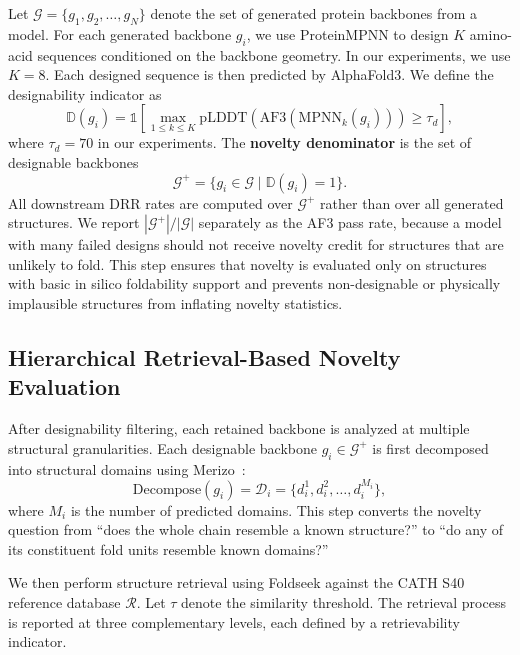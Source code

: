 \documentclass[letterpaper]{article} %
\begin{document}
Let $\mathcal{G} = \{g_1, g_2, \ldots, g_N\}$ denote the set of generated protein backbones from a model. For each generated backbone $g_i$, we use ProteinMPNN to design $K$ amino-acid sequences conditioned on the backbone geometry. In our experiments, we use $K=8$. Each designed sequence is then predicted by AlphaFold3. We define the designability indicator as
\begin{equation}
\mathbb{D}(g_i) =
\mathbb{1}\!\left[
\max_{1 \leq k \leq K}
\mathrm{pLDDT}\!\left(\mathrm{AF3}(\mathrm{MPNN}_k(g_i))\right)
\geq \tau_d
\right],
\end{equation}
where $\tau_d = 70$ in our experiments. The \textbf{novelty denominator} is the set of designable backbones
\begin{equation}
\mathcal{G}^{+} = \{g_i \in \mathcal{G} \mid \mathbb{D}(g_i) = 1\}.
\end{equation}
All downstream DRR rates are computed over $\mathcal{G}^{+}$ rather than over all generated structures. We report $|\mathcal{G}^{+}|/|\mathcal{G}|$ separately as the AF3 pass rate, because a model with many failed designs should not receive novelty credit for structures that are unlikely to fold. This step ensures that novelty is evaluated only on structures with basic in silico foldability support and prevents non-designable or physically implausible structures from inflating novelty statistics.

\subsection{Hierarchical Retrieval-Based Novelty Evaluation}

After designability filtering, each retained backbone is analyzed at multiple structural granularities. Each designable backbone $g_i \in \mathcal{G}^{+}$ is first decomposed into structural domains using Merizo~\cite{merizo}:
\begin{equation}
\mathrm{Decompose}(g_i) = \mathcal{D}_i = \{d_i^1, d_i^2, \ldots, d_i^{M_i}\},
\end{equation}
where $M_i$ is the number of predicted domains. This step converts the novelty question from ``does the whole chain resemble a known structure?'' to ``do any of its constituent fold units resemble known domains?''

We then perform structure retrieval using Foldseek against the CATH S40 reference database $\mathcal{R}$. Let $\tau$ denote the similarity threshold. The retrieval process is reported at three complementary levels, each defined by a retrievability indicator.
\end{document}
